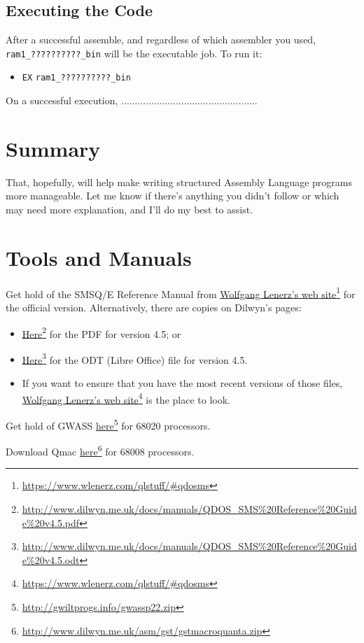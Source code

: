 \subsection{Executing the Code}

After a successful assemble, and regardless of which assembler you
used, \texttt{ram1\_??????????\_bin} will be the executable job. To
run it:
\begin{itemize}
\item \texttt{EX} \texttt{ram1\_??????????\_bin}
\end{itemize}
On a successful execution, ..................................................

\section{Summary}

That, hopefully, will help make writing structured Assembly Language
programs more manageable. Let me know if there's anything you didn't
follow or which may need more explanation, and I'll do my best to
assist.

\section{Tools and Manuals\label{sec:Tools-and-Manuals}}

Get hold of the SMSQ/E Reference Manual from \href{https://www.wlenerz.com/qlstuff/\#qdosms}{Wolfgang Lenerz's web site}\footnote{\url{https://www.wlenerz.com/qlstuff/\#qdosms}}
for the official version. Alternatively, there are copies on Dilwyn's
pages:
\begin{itemize}
\item \href{http://www.dilwyn.me.uk/docs/manuals/QDOS_SMS\%20Reference\%20Guide\%20v4.5.pdf}{Here}\footnote{\url{http://www.dilwyn.me.uk/docs/manuals/QDOS\_SMS\%20Reference\%20Guide\%20v4.5.pdf}}
for the PDF for version 4.5; or

\item \href{http://www.dilwyn.me.uk/docs/manuals/QDOS_SMS\%20Reference\%20Guide\%20v4.5.odt}{Here}\footnote{\url{http://www.dilwyn.me.uk/docs/manuals/QDOS\_SMS\%20Reference\%20Guide\%20v4.5.odt}}
for the ODT (Libre Office) file for version 4.5.

\item If you want to ensure that you have the most recent versions of those
files, \href{https://www.wlenerz.com/qlstuff/\#qdosms}{Wolfgang Lenerz's web site}\footnote{\url{https://www.wlenerz.com/qlstuff/\#qdosms}}
is the place to look.
\end{itemize}

Get hold of GWASS \href{http://gwiltprogs.info/gwassp22.zip}{here}\footnote{\url{http://gwiltprogs.info/gwassp22.zip}}
for 68020 processors.

Download Qmac \href{http://www.dilwyn.me.uk/asm/gst/gstmacroquanta.zip}{here}\footnote{\url{http://www.dilwyn.me.uk/asm/gst/gstmacroquanta.zip}}
for 68008 processors.
